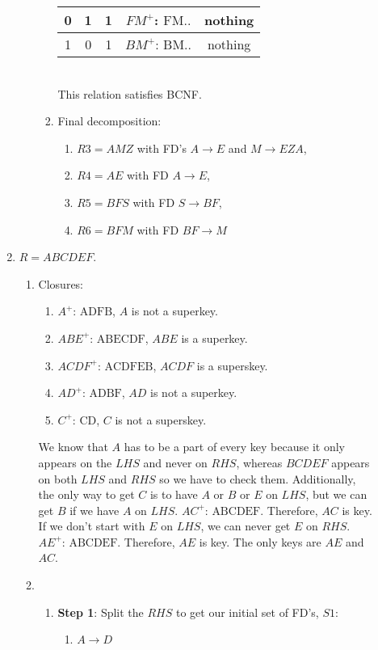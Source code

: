 \documentclass{csc_assignment2}
\begin{document}
\begin{description}
\begin{enumerate}
\begin{enumerate}
\begin{enumerate}
\begin{tabular}{ |c|c|c|c|c| }
 \hline
 0 & 1 & 1 & $FM^{+}$: $\text{FM..}$ & nothing \\
 \hline
 1 & 0 & 1 & $BM^{+}$: $\text{BM..}$ & nothing \\
 \hline
\end{tabular} \\[3pt] This relation satisfies BCNF.
\item Final decomposition: \begin{enumerate}
\item $R3 = AMZ$ with FD's $A \rightarrow E$ and $M \rightarrow EZA$,
\item $R4 = AE$ with FD $A \rightarrow E$,
\item $R5 = BFS$ with FD $S \rightarrow BF$,
\item $R6 = BFM$ with FD $BF \rightarrow M$
\end{enumerate}
\end{enumerate}
\end{enumerate}
\item $R = ABCDEF$. \begin{enumerate} \item Closures:
\begin{enumerate}
\item $A^{+}$: $\text{ADFB}$, $A$ is not a superkey.
\item $ABE^{+}$: $\text{ABECDF}$, $ABE$ is a superkey. 
\item $ACDF^{+}$: $\text{ACDFEB}$, $ACDF$ is a superskey.
\item $AD^{+}$: $\text{ADBF}$, $AD$ is not a superkey.
\item $C^{+}$: $\text{CD}$, $C$ is not a superskey.
\end{enumerate}
We know that $A$ has to be a part of every key because it only appears on the $LHS$ and never on $RHS$, whereas $BCDEF$ appears on both $LHS$ and $RHS$ so we have to check them. Additionally, the only way to get $C$ is to have $A$ or $B$ or $E$ on $LHS$, but we can get $B$ if we have $A$ on $LHS$. $AC^{+}$: $\text{ABCDEF}$. Therefore, $AC$ is key. If we don't start with $E$ on $LHS$, we can never get $E$ on $RHS$. $AE^{+}$: $\text{ABCDEF}$. Therefore, $AE$ is key. The only keys are $AE$ and $AC$. \newpage
\item \begin{enumerate} \item \textbf{Step 1}: Split the $RHS$ to get our initial set of FD's, $S1$: \begin{enumerate}
\item $A \rightarrow D$

\end{enumerate}
\end{enumerate}
\end{enumerate}
\end{enumerate}
\end{description}
\end{document}
